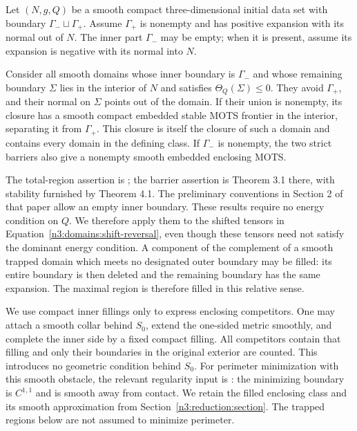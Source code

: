 \begin{theorem}
\label{n3:domains:region-theorem}
Let $(N,g,Q)$ be a smooth compact three-dimensional initial data set
with boundary $\Gamma_-\sqcup\Gamma_+$.  Assume $\Gamma_+$ is nonempty
and has positive expansion with its normal out of $N$.  The inner part
$\Gamma_-$ may be empty; when it is present, assume its expansion is
negative with its normal into $N$.

Consider all smooth domains whose inner boundary is $\Gamma_-$ and
whose remaining boundary $\Sigma$ lies in the interior of $N$ and
satisfies $\Theta_Q(\Sigma)\leq0$.  They avoid $\Gamma_+$, and their
normal on $\Sigma$ points out of the domain.  If their union is
nonempty, its closure has a smooth compact embedded stable MOTS
frontier in the interior, separating it from $\Gamma_+$.  This closure
is itself the closure of such a domain and contains every domain in
the defining class.  If $\Gamma_-$ is nonempty, the two strict barriers
also give a nonempty smooth embedded enclosing MOTS.
\end{theorem}

The total-region assertion is
\cite[Definitions 7.1--7.2 and Theorem 7.3]{AnderssonMetzger2009}; the
barrier assertion is Theorem 3.1 there, with stability furnished by
Theorem 4.1.  The preliminary conventions in Section 2 of that paper
allow an empty inner boundary.  These results require no energy
condition on $Q$.  We therefore apply them to the shifted tensors in
Equation~\eqref{n3:domains:shift-reversal}, even though these tensors
need not satisfy the dominant energy condition.  A component of the
complement of a smooth trapped domain which meets no designated outer
boundary may be filled: its entire boundary is then deleted and the
remaining boundary has the same expansion.  The maximal region is
therefore filled in this relative sense.

We use compact inner fillings only to express enclosing competitors.
One may attach a smooth collar behind $S_0$, extend the one-sided
metric smoothly, and complete the inner side by a fixed compact
filling.  All competitors contain that filling and only their
boundaries in the original exterior are counted.  This introduces no
geometric condition behind $S_0$.  For perimeter minimization with
this smooth obstacle, the relevant regularity input is
\cite[Regularity Theorem 1.3(iii)]{HuiskenIlmanen2001}: the minimizing
boundary is $C^{1,1}$ and is smooth away from contact.  We retain the
filled enclosing class and its smooth approximation from
Section~\ref{n3:reduction:section}.  The trapped regions below are not
assumed to minimize perimeter.

